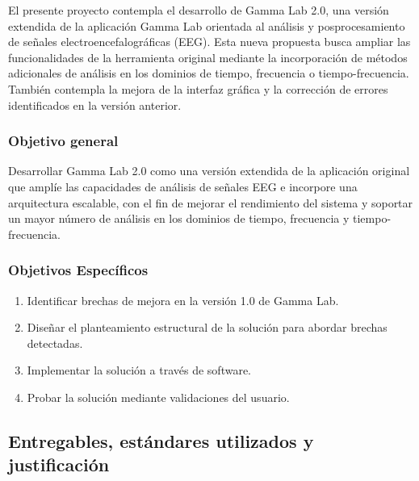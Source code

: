 \documentclass[12pt,letterpaper]{article}
\begin{document}
El presente proyecto contempla el desarrollo de Gamma Lab 2.0, una versión extendida de la aplicación Gamma Lab orientada al análisis y posprocesamiento de señales electroencefalográficas (EEG). Esta nueva propuesta busca ampliar las funcionalidades de la herramienta original mediante la incorporación de métodos adicionales de análisis en los dominios de tiempo, frecuencia o tiempo-frecuencia. También contempla la mejora de la interfaz gráfica y la corrección de errores identificados en la versión anterior. 



\subsubsection{Objetivo general} 

Desarrollar Gamma Lab 2.0 como una versión extendida de la aplicación original que amplíe las capacidades de análisis de señales EEG e incorpore una arquitectura escalable, con el fin de mejorar el rendimiento del sistema y soportar un mayor número de análisis en los dominios de tiempo, frecuencia y tiempo-frecuencia.


\subsubsection{Objetivos Específicos}
\label{sec:obj-esp}
\begin{enumerate}
  \item Identificar brechas de mejora en la versión 1.0 de Gamma Lab.
  \item Diseñar el planteamiento estructural de la solución para abordar brechas detectadas.
  \item Implementar la solución a través de software.
  \item Probar la solución mediante validaciones del usuario.
\end{enumerate} %


\subsection{Entregables, estándares utilizados y justificación}

\newcommand{\estilotabla}{
  \small
  \renewcommand{\arraystretch}{1.5}
  \centering
}

\end{document}
